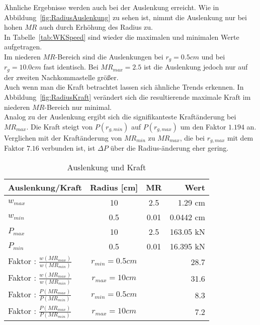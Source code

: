 Ähnliche Ergebnisse werden auch bei der Auslenkung erreicht. Wie in Abbildung~\ref{fig:RadiusAuslenkung} zu sehen ist, nimmt die Auslenkung nur bei hohen $MR$ auch durch Erhöhung des Radius zu.\\
In Tabelle~\ref{tab:WKSpeed} sind wieder die maximalen und minimalen Werte aufgetragen.\\
Im niederen $MR$-Bereich sind die Auslenkungen bei $r_{g} = 0.5 cm$ und bei $r_{g} = 10.0 cm$ fast identisch.  Bei $MR_{max} = 2.5$ ist die Auslenkung jedoch nur auf der zweiten Nachkommastelle größer.\\
Auch wenn man die Kraft betrachtet lassen sich ähnliche Trends erkennen. In Abbildung~\ref{fig:RadiusKraft} verändert sich die resultierende maximale Kraft im niederen $MR$-Bereich nur minimal.\\
Analog zu der Auslenkung ergibt sich die signifikanteste Kraftänderung bei $MR_{max}$. Die Kraft steigt von $P(r_{g,min})$ auf $P(r_{g,max})$ um den Faktor $1.194$ an. Verglichen mit der Kraftänderung von $MR_{min}$ zu $MR_{max}$, die bei $r_{g,max}$ mit dem Faktor $7.16$ verbunden ist, ist $\Delta P$ über die Radius-änderung eher gering. 

\begin{table}[H]
	\begin{center}
		\caption{Auslenkung und Kraft}
		\label{tab:WKRadius}
		\begin{tabular}{l|c|c|r}
			\textbf{Auslenkung/Kraft} & \textbf{Radius [cm]} & \textbf{MR} & \textbf{Wert}\\
			\hline
			$w_{max}$ & 10 & 2.5 & 1.29 cm\\
			$w_{min}$ & 0.5 & 0.01 & 0.0442 cm\\
			\hline
			$P_{max}$ & 10 & 2.5 & 163.05 kN\\
			$P_{min}$ & 0.5 & 0.01 & 16.395 kN\\
			\hline
			Faktor : $\frac{w(MR_{max})}{w(MR_{min})}$ & $r_{min}=0.5 cm$ & & 28.7\\
			Faktor : $\frac{w(MR_{max})}{w(MR_{min})}$ & $r_{max}=10 cm$ & & 31.6\\
			\hline
			Faktor : $\frac{P(MR_{max})}{P(MR_{min})}$ & $r_{min}=0.5 cm$ & & 8.3\\
			Faktor : $\frac{P(MR_{max})}{P(MR_{min})}$ & $r_{max}=10 cm$ & & 7.2\\
		\end{tabular}
	\end{center}
\end{table}

